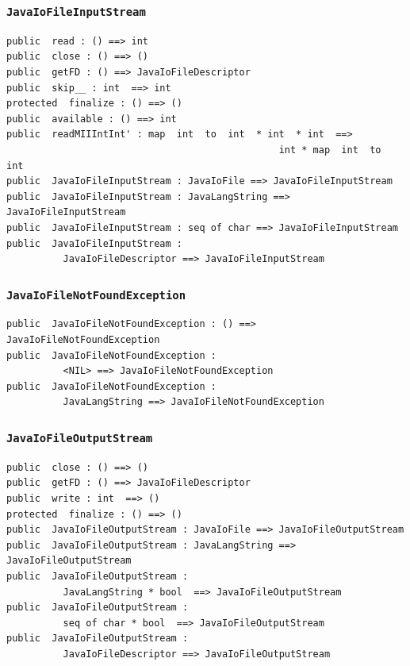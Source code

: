 \documentclass[\pformat,12pt]{article}
\begin{document}
\subsubsection{\texttt{JavaIoFileInputStream}}
\begin{small}
\begin{verbatim}
public  read : () ==> int
public  close : () ==> ()
public  getFD : () ==> JavaIoFileDescriptor
public  skip__ : int  ==> int
protected  finalize : () ==> ()
public  available : () ==> int
public  readMIIIntInt' : map  int  to  int  * int  * int  ==> 
                                                int * map  int  to  int
public  JavaIoFileInputStream : JavaIoFile ==> JavaIoFileInputStream
public  JavaIoFileInputStream : JavaLangString ==> JavaIoFileInputStream
public  JavaIoFileInputStream : seq of char ==> JavaIoFileInputStream
public  JavaIoFileInputStream : 
          JavaIoFileDescriptor ==> JavaIoFileInputStream
\end{verbatim}
\end{small}

\subsubsection{\texttt{JavaIoFileNotFoundException}}
\begin{small}
\begin{verbatim}
public  JavaIoFileNotFoundException : () ==> JavaIoFileNotFoundException
public  JavaIoFileNotFoundException : 
          <NIL> ==> JavaIoFileNotFoundException
public  JavaIoFileNotFoundException : 
          JavaLangString ==> JavaIoFileNotFoundException
\end{verbatim}
\end{small}

\subsubsection{\texttt{JavaIoFileOutputStream}}
\begin{small}
\begin{verbatim}
public  close : () ==> ()
public  getFD : () ==> JavaIoFileDescriptor
public  write : int  ==> ()
protected  finalize : () ==> ()
public  JavaIoFileOutputStream : JavaIoFile ==> JavaIoFileOutputStream
public  JavaIoFileOutputStream : JavaLangString ==> JavaIoFileOutputStream
public  JavaIoFileOutputStream : 
          JavaLangString * bool  ==> JavaIoFileOutputStream
public  JavaIoFileOutputStream : 
          seq of char * bool  ==> JavaIoFileOutputStream
public  JavaIoFileOutputStream : 
          JavaIoFileDescriptor ==> JavaIoFileOutputStream
\end{verbatim}
\end{small}
\end{document}
